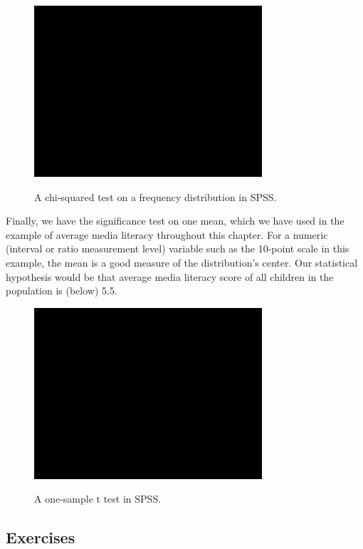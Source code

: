 \documentclass[a4paper]{book}
\theoremstyle{definition}
\theoremstyle{definition}
\theoremstyle{definition}
\theoremstyle{remark}
\begin{document}
\begin{figure}[H]
\href{https://www.youtube.com/embed/S8I5o_3p6ro}{\includegraphics[width=320px]{GentleIntro_files/figure-latex/SPSSchisq1-1} }\caption{A chi-squared test on a frequency distribution in SPSS.}\label{fig:SPSSchisq1}
\end{figure}

Finally, we have the significance test on one mean, which we have used
in the example of average media literacy throughout this chapter. For a
numeric (interval or ratio measurement level) variable such as the
10-point scale in this example, the mean is a good measure of the
distribution's center. Our statistical hypothesis would be that average
media literacy score of all children in the population is (below) 5.5.

\begin{figure}[H]
\href{https://www.youtube.com/embed/Bx0eiqfVfaw}{\includegraphics[width=320px]{GentleIntro_files/figure-latex/SPSS1mean-1} }\caption{A one-sample t test in SPSS.}\label{fig:SPSS1mean}
\end{figure}

\subsection{Exercises}\label{exercises-3}
\end{document}
